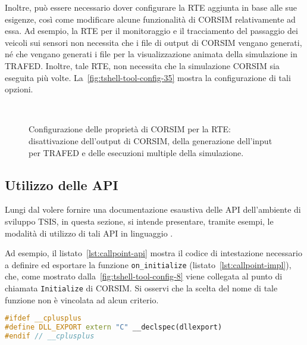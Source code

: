 Inoltre, può essere necessario dover configurare la \acs{RTE} aggiunta in base alle sue esigenze, così come modificare alcune funzionalità di \acs{CORSIM} relativamente ad essa. Ad esempio, la \acs{RTE} per il monitoraggio e il tracciamento del passaggio dei veicoli sui sensori non necessita che i file di output di \acs{CORSIM} vengano generati, né che vengano generati i file per la visualizzazione animata della simulazione in \acs{TRAFED}. Inoltre, tale \acs{RTE}, non necessita che la simulazione \acs{CORSIM} sia eseguita più volte. La~\vref{fig:tshell-tool-config-35} mostra la configurazione di tali opzioni.
\begin{figure}[H]
\centering
{} \\
\caption[Configurazione delle proprietà di \acs{CORSIM}]{Configurazione delle proprietà di \acs{CORSIM} per la \acs{RTE}: disattivazione dell'output di \acs{CORSIM}, della generazione dell'input per \acs{TRAFED} e delle esecuzioni multiple della simulazione.}
\label{fig:tshell-tool-config-35}
\end{figure}

\cleardoublepage
\subsection{Utilizzo delle API}\label{sec:tsis-api-examples}
Lungi dal volere fornire una documentazione esaustiva delle \acs{API} dell'ambiente di sviluppo \acs{TSIS}, in questa sezione, si intende presentare, tramite esempi, le modalità di utilizzo di tali \acs{API} in linguaggio \CC{}.

Ad esempio, il listato~\ref{lst:callpoint-api} mostra il codice di intestazione necessario a definire ed esportare la funzione \lstinline[]|on_initialize| (listato~\ref{lst:callpoint-impl}), che, come mostrato dalla~\vref{fig:tshell-tool-config-8} viene collegata al punto di chiamata \lstinline[]|Initialize| di \acs{CORSIM}. Si osservi che la scelta del nome di tale funzione non è vincolata ad alcun criterio.

\vspace*{8pt}\begin{lstlisting}[language=cpp, caption=Costrutto per l'esportazione delle funzioni \acs{RTE}, label=lst:callpoint-api]
#ifdef __cplusplus
#define DLL_EXPORT extern "C" __declspec(dllexport)
#endif // __cplusplus
\end{lstlisting}

